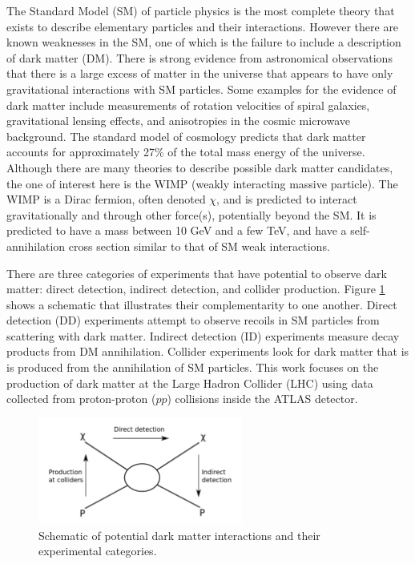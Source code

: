 \label{chapter:introduction}

The Standard Model (SM) of particle physics is the most complete theory that exists to describe elementary particles and their interactions. However there are known weaknesses in the SM, one of which is the failure to include a description of dark matter (DM). There is strong evidence from astronomical observations that there is a large excess of matter in the universe that appears to have only gravitational interactions with SM particles. Some examples for the evidence of dark matter include measurements of rotation velocities of spiral galaxies, gravitational lensing effects, and anisotropies in the cosmic microwave background. The standard model of cosmology predicts that dark matter accounts for approximately 27\% of the total mass energy of the universe. Although there are many theories to describe possible dark matter candidates, the one of interest here is the WIMP (weakly interacting massive particle). The WIMP is a Dirac fermion, often denoted $\chi$, and is predicted to interact gravitationally and through other force(s), potentially beyond the SM. It is predicted to have a mass between 10 GeV and a few TeV, and have a self-annihilation cross section similar to that of SM weak interactions.

There are three categories of experiments that have potential to observe dark matter: direct detection, indirect detection, and collider production. Figure \ref{fig:detection} shows a schematic that illustrates their complementarity to one another. Direct detection (DD) experiments attempt to observe recoils in SM particles from scattering with dark matter. Indirect detection (ID) experiments measure decay products from DM annihilation. Collider experiments look for dark matter that is is produced from the annihilation of SM particles. This work focuses on the production of dark matter at the Large Hadron Collider (LHC) using data collected from proton-proton ($pp$) collisions inside the ATLAS detector.

\begin{figure}[htb]
\centering
\includegraphics[width=0.6\textwidth]{Figures/detection.png}
\caption{Schematic of potential dark matter interactions and their experimental categories.}
\label{fig:detection}
\end{figure}

